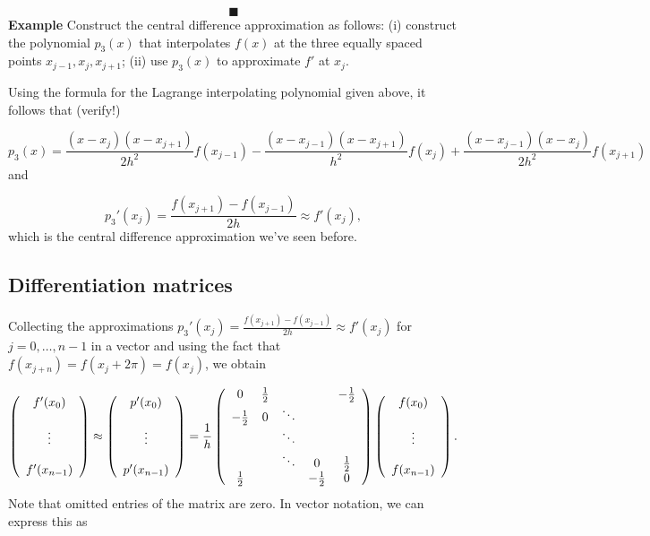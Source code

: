 \documentclass[12pt,landscape]{article}
\begin{document}
{\[
\blacksquare
\]
\textbf{Example} Construct the central difference approximation as follows: (i) construct the polynomial $p_3(x)$ that interpolates $f(x)$  at the three equally spaced points $x_{j-1}, x_j, x_{j+1}$; (ii) use $p_3(x)$ to approximate  $f'$ at $x_j$.

Using the formula for the Lagrange interpolating polynomial given above, it follows that (verify!)

\[
p_3(x) = \frac{(x-x_{j})(x-x_{j+1})}{2h^2}f(x_{j-1}) - \frac{(x-x_{j-1})(x-x_{j+1})}{h^2}f(x_{j}) + \frac{(x-x_{j-1})(x-x_{j})}{2h^2}f(x_{j+1})
\]
and

\[
p_3'(x_j) = \frac{f(x_{j+1}) - f(x_{j-1})}{2h}  \approx f'(x_j),
\]
which is the central difference approximation we've seen before.

\subsection{Differentiation matrices}
Collecting the approximations $p_3'(x_j) = \frac{f(x_{j+1}) - f(x_{j-1})}{2h}  \approx f'(x_j)$ for $j = 0, \ldots, n-1$ in a vector and using the fact that $f(x_{j+n}) = f(x_j + 2\pi) = f(x_{j})$, we obtain

\[
\left(
\begin{array}{c c c c c}
f'(x_0) \\
  \\
\vdots  \\
  \\
f'(x_{n-1})
\end{array}
\right) \approx 
\left(
\begin{array}{c c c c c}
p'(x_0) \\
  \\
\vdots  \\
  \\
p'(x_{n-1})
\end{array}
\right) = \frac{1}{h}
\left(
\begin{array}{c c c c c}
0 & \frac{1}{2} &   &   &  -\frac{1}{2} \\
-\frac{1}{2} & 0 & \ddots &  &  \\
   &   & \ddots &  &   \\
   &   & \ddots & 0 &  \frac{1}{2} \\
 \frac{1}{2}  &   &   & -\frac{1}{2} & 0
\end{array}
\right)
\left(
\begin{array}{c c c c c}
f(x_0) \\
  \\
\vdots  \\
  \\
f(x_{n-1})
\end{array}
\right).
\]
Note that omitted entries of the matrix are zero.  In vector notation, we can express this as

}
\end{document}
